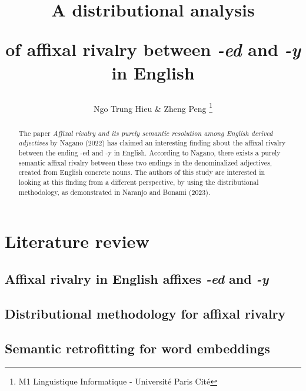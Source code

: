 \documentclass[12pt]{article}
\title{A distributional analysis 

of affixal rivalry between \emph{-ed} and \emph{-y} in English}
\author{Ngo Trung Hieu & Zheng Peng \thanks{M1 Linguistique Informatique - Université Paris Cité}}
\date{}
\begin{document}
\maketitle

\begin{abstract}
    The paper \emph{Affixal rivalry and its purely semantic resolution among English derived adjectives} by Nagano (2022) has claimed an interesting finding about the affixal rivalry between the ending -ed and -y in English. According to Nagano, there exists a purely semantic affixal rivalry between these two endings in the denominalized adjectives, created from English concrete nouns. The authors of this study are interested in looking at this finding from a different perspective, by using the distributional methodology, as demonstrated in Naranjo and Bonami (2023).
\end{abstract}

\section{Literature review}
\subsection{Affixal rivalry in English affixes \emph{-ed} and \emph{-y}}

\subsection{Distributional methodology for affixal rivalry}

\subsection{Semantic retrofitting for word embeddings}
\end{document}

